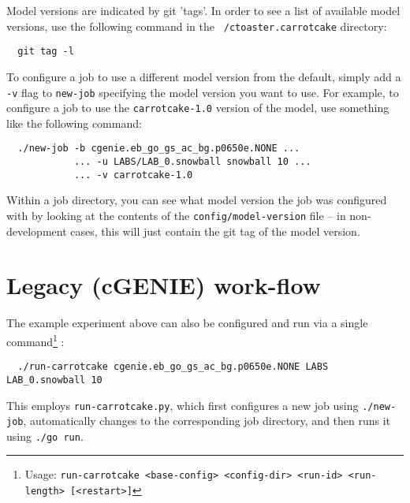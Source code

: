 \documentclass[a4paper,10pt,article]{memoir}
\begin{document}
Model versions are indicated by git 'tags'.  In order to see a list
of available model versions, use the following command in the
\texttt{~/ctoaster.carrotcake} directory:
\begin{verbatim}
  git tag -l
\end{verbatim}
To configure a job to use a different model version from the default,
simply add a \texttt{-v} flag to \texttt{new-job} specifying the model
version you want to use.  For example, to configure a job to use the
\texttt{carrotcake-1.0} version of the model, use something like the
following command:
\begin{verbatim}
  ./new-job -b cgenie.eb_go_gs_ac_bg.p0650e.NONE ...
            ... -u LABS/LAB_0.snowball snowball 10 ...
            ... -v carrotcake-1.0
\end{verbatim}
Within a job directory, you can see what model version the job was
configured with by looking at the contents of the
\texttt{config/model-version} file -- in non-development cases, this
will just contain the git tag of the model version.

\section{Legacy (cGENIE) work-flow}

The example experiment above can also be configured and run via a single command\footnote{Usage: \texttt{run-carrotcake <base-config> <config-dir> <run-id> <run-length> [<restart>]}} :
\begin{verbatim}
  ./run-carrotcake cgenie.eb_go_gs_ac_bg.p0650e.NONE LABS LAB_0.snowball 10
\end{verbatim}
This employs \texttt{run-carrotcake.py}, which first configures a new job using \texttt{./new-job},
automatically changes to the corresponding job directory, and then runs it using \texttt{./go run}.


\newpage

\end{document}
